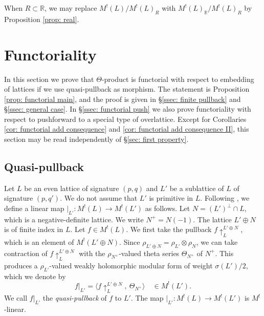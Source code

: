 \documentclass[12pt]{amsart}
\numberwithin{equation}{section}
\theoremstyle{definition}
\theoremstyle{remark}
\newcommand{\R}{\mathbb{R}}
\newcommand{\ML}{M^{!}(L)}
\newcommand{\MLR}{M^{!}(L)_{R}}
\begin{document}
When $R\subset {\R}$, we may replace ${\ML}/{\MLR}$ with 
$M^!(L)_{{\R}}/{\MLR}$ by Proposition \ref{prop: real}. 





\section{Functoriality}\label{sec: functorial}  

In this section we prove that  
$\Theta$-product is functorial with respect to embedding of lattices 
if we use quasi-pullback as morphism. 
The statement is Proposition \ref{prop: functorial main}, 
and the proof is given in \S \ref{ssec: finite pullback} and  \S \ref{ssec: general case}. 
In \S \ref{ssec: functorial push} we also prove functoriality 
with respect to pushforward to a special type of overlattice. 
Except for Corollaries \ref{cor: functorial add consequence} and \ref{cor: functorial add consequence II}, 
this section may be read independently of \S \ref{sec: first property}. 



\subsection{Quasi-pullback}\label{ssec: quasi-pullback} 

Let $L$ be an even lattice of signature $(p, q)$ %
and $L'$ be a sublattice of $L$ of signature $(p, q')$. %
We do not assume that $L'$ is primitive in $L$. 
Following \cite{Ma}, we define a linear map 
$|_{L'} \colon {\ML}\to M^{!}(L')$ as follows. 
Let 
$N=(L')^{\perp}\cap L$, 
which is a negative-definite lattice. 
We write $N^{+}=N(-1)$. 
The lattice $L'\oplus N$ is of finite index in $L$. 
Let $f\in {\ML}$. 
We first take the pullback 
$f\!\uparrow_{L}^{L'\oplus N}$, 
which is an element of $M^!(L'\oplus N)$. 
Since 
$\rho_{L'\oplus N} = \rho_{L'}\otimes \rho_{N}$, 
we can take contraction of $f\!\uparrow_{L}^{L'\oplus N}$ 
with the $\rho_{N^{+}}$-valued theta series $\Theta_{N^{+}}$ of $N^{+}$. 
This produces a $\rho_{L'}$-valued weakly holomorphic modular form of weight $\sigma(L')/2$, 
which we denote by 
\begin{equation}\label{eqn: define quasi-pullback}
f|_{L'} = \langle f\!\uparrow_{L}^{L'\oplus N}, \: \Theta_{N^{+}} \rangle \quad \in M^{!}(L'). 
\end{equation}
We call $f|_{L'}$ the \textit{quasi-pullback} of $f$ to $L'$. 
The map $|_{L'} \colon {\ML}\to M^!(L')$ is $M^!$-linear. 
\end{document}
